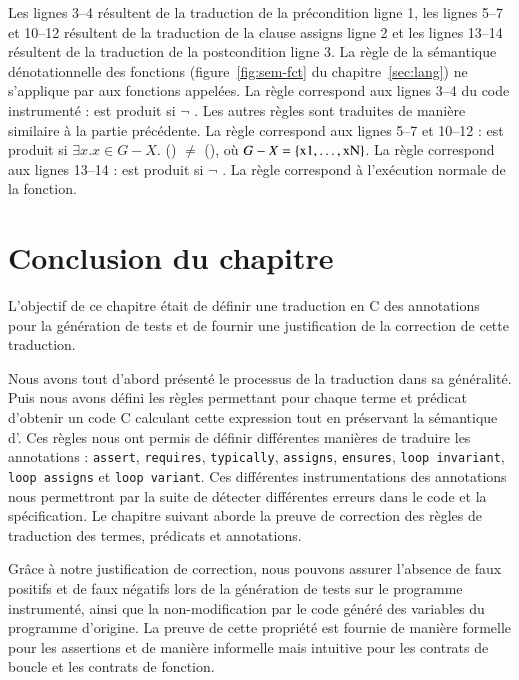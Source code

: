 Les lignes 3--4 résultent de la traduction de la précondition ligne 1,
les lignes 5--7 et 10--12 résultent de la traduction de la clause assigns ligne
2 et les lignes 13--14 résultent de la traduction de la postcondition ligne 3.
La règle  de la sémantique dénotationnelle des fonctions
(figure~\ref{fig:sem-fct} du chapitre~\ref{sec:lang}) ne s'applique par aux
fonctions appelées.
La règle  correspond aux lignes 3--4 du code instrumenté :
\errorenv est produit si $\lnot$ .
Les autres règles sont traduites de manière similaire à la partie précédente.
La règle  correspond aux lignes 5--7 et 10--12 : \errorenv est
produit si $\exists x. x \in G-X.$
() $\ne$ (),
où $G-X = \{\mbox{\lstinline'x1'},\ldots,\mbox{\lstinline'xN'}\}$.
La règle  correspond aux lignes 13--14 : \errorenv est produit
si $\lnot$ .
La règle  correspond à l'exécution normale de la fonction.






\section*{Conclusion du chapitre}

L'objectif de ce chapitre était de définir une traduction en C des annotations
\eacsl pour la génération de tests et de fournir une justification de la
correction de cette traduction.

Nous avons tout d'abord présenté le processus de la traduction dans sa
généralité.
Puis nous avons défini les règles permettant pour chaque terme et prédicat
\eacsl d'obtenir un code C calculant cette expression tout en préservant la
sémantique d'\eacsl.
Ces règles nous ont permis de définir différentes manières de traduire les
annotations \eacsl : \lstinline'assert', \lstinline'requires',
\lstinline'typically', \lstinline'assigns', \lstinline'ensures',
\lstinline'loop invariant', \lstinline'loop assigns' et
\lstinline'loop variant'.
Ces différentes instrumentations des annotations nous permettront par la suite
de détecter différentes erreurs dans le code et la spécification.
Le chapitre suivant aborde la preuve de correction des règles de traduction des
termes, prédicats et annotations.

Grâce à notre justification de correction, nous pouvons assurer l'absence de
faux positifs et de faux négatifs lors de la génération de tests sur le
programme instrumenté, ainsi que la non-modification par le code généré des
variables du programme d'origine.
La preuve de cette propriété est fournie de manière formelle pour les assertions
et de manière informelle mais intuitive pour les contrats de boucle et les
contrats de fonction.



